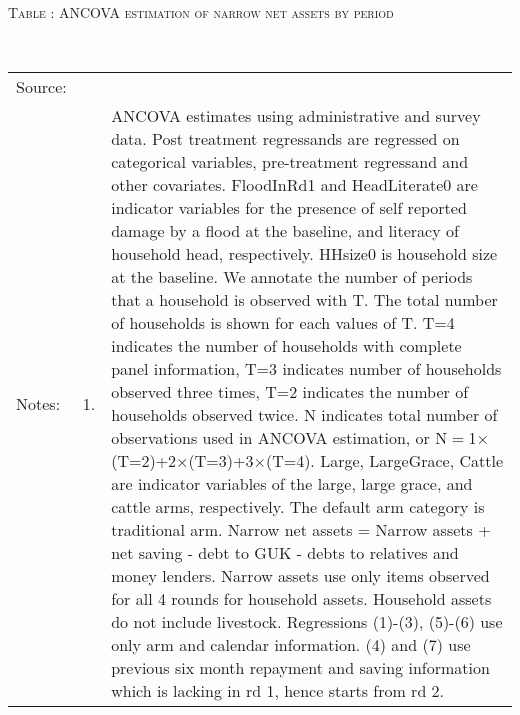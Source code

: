 \hspace{-1cm}\begin{minipage}[t]{14cm} \hfil\textsc{\normalsize Table \thetable: ANCOVA estimation of narrow net assets by period\label{tab ANCOVA narrow net assets timevarying}}\\ \setlength{\tabcolsep}{1pt}
  \setlength{\baselineskip}{8pt}
  \renewcommand{\arraystretch}{.55}
  \hfil{}\\
\renewcommand{\arraystretch}{.8}
\setlength{\tabcolsep}{1pt} \begin{tabular}{>{\hfill\scriptsize}p{1cm}<{}>{\hfill\scriptsize}p{.25cm}<{}>{\scriptsize}p{12cm}<{\hfill}} 
Source:& \multicolumn{2}{l}{\scriptsize Estimated with GUK administrative and survey data.}\\
Notes: & 1. & ANCOVA estimates using administrative and survey data. Post treatment regressands are regressed on categorical variables, pre-treatment regressand and other covariates. \textsf{FloodInRd1} and \textsf{HeadLiterate0} are indicator variables for the presence of self reported damage by a flood at the baseline, and literacy of household head, respectively. \textsf{HHsize0} is household size at the baseline. We annotate the number of periods that a household is observed with \textsf{T}. The total number of households is shown for each values of \textsf{T}. \textsf{T=4} indicates the number of households with complete panel information, \textsf{T=3} indicates number of households observed three times, \textsf{T=2} indicates the number of households observed twice. \textsf{N} indicates total number of observations used in ANCOVA estimation, or \textsf{N$=$1$\times$(T=2)+2$\times$(T=3)+3$\times$(T=4)}.  \textsf{Large}, \textsf{LargeGrace}, \textsf{Cattle} are indicator variables of the \textsf{large}, \textsf{large grace}, and \textsf{cattle} arms, respectively. The default arm category is \textsf{traditional} arm. Narrow net assets = Narrow assets + net saving - debt to GUK - debts to relatives and money lenders. Narrow assets use only items observed for all 4 rounds for household assets. Household assets do not include livestock. Regressions (1)-(3), (5)-(6) use only arm and calendar information. (4) and (7) use previous six month repayment and saving information which is lacking in rd 1, hence starts from rd 2.\\

\end{tabular}
\end{minipage}

